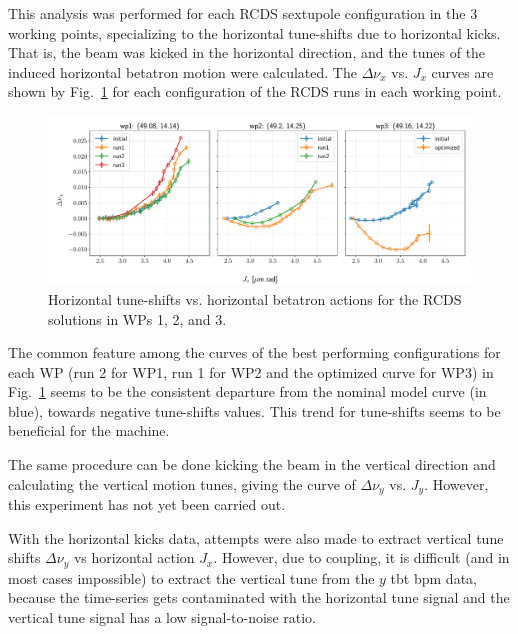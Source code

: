 This analysis was performed for each \gls*{RCDS} sextupole configuration in the 3 working points, specializing to the horizontal tune-shifts due to horizontal kicks. That is, the beam was kicked in the horizontal direction, and the tunes of the induced horizontal betatron motion were calculated. The $\Delta \nu_x$ vs. $J_x$ curves are shown by Fig.~\ref{fig:adts} for each configuration of the \gls*{RCDS} runs in each working point.
\begin{figure}[tb]
    \includegraphics[width=\textwidth]{Images/opt_configs_dtunes.pdf}
    \caption[Horizontal tune-shifts vs. horizontal betatron actions for the RCDS solutions and for the computer model in WPs 1, 2, and 3.]{Horizontal tune-shifts vs. horizontal betatron actions for the \gls*{RCDS} solutions in WPs 1, 2, and 3.}
    \label{fig:adts}
\end{figure}


The common feature among the curves of the best performing configurations for each WP (run 2 for \gls*{WP1}, run 1 for \gls*{WP2} and the optimized curve for \gls*{WP3}) in Fig.~\ref{fig:adts} seems to be the consistent departure from the nominal model curve (in blue), towards negative tune-shifts values. This trend for tune-shifts seems to be beneficial for the machine.

The same procedure can be done kicking the beam in the vertical direction and calculating the vertical motion tunes, giving the curve of $\Delta \nu_y$ vs. $J_y$. However, this experiment has not yet been carried out.

With the horizontal kicks data, attempts were also made to extract vertical tune shifts $\Delta \nu_y$ vs horizontal action $J_x$. However, due to coupling, it is difficult (and in most cases impossible) to extract the vertical tune from the $y$ \gls*{tbt} \gls*{bpm} data, because the time-series gets contaminated with the horizontal tune signal and the vertical tune signal has a low signal-to-noise ratio.

